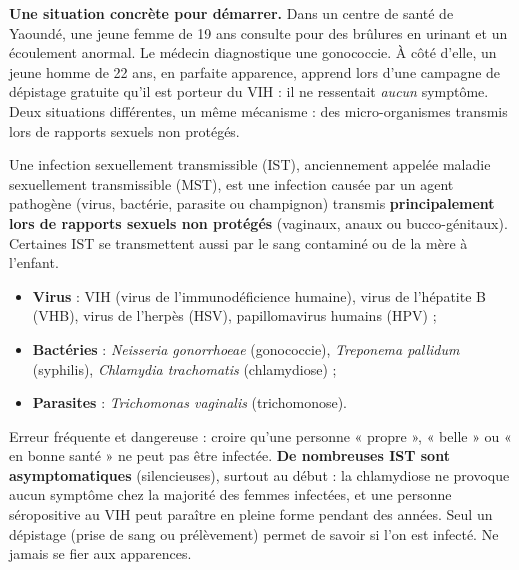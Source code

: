 \documentclass[11pt]{article}
\newcommand{\cle}[1]{{\popxbold\color{popdark}#1}}
\newcounter{popsec}
\newcounter{popsub}
\newcommand{\courssub}[1]{%
  \stepcounter{popsub}%
  \par\vspace{9pt}\noindent{\popxbold\fontsize{11.5}{13}\selectfont\color{popink}{\color{poporange}\thepopsec.\thepopsub}\hspace{6pt}#1}\par\nopagebreak\vspace{4pt}
}
\begin{document}
\courssub{Qu'est-ce qu'une IST ?}

\textbf{Une situation concrète pour démarrer.} Dans un centre de santé de Yaoundé, une jeune femme de 19 ans consulte pour des brûlures en urinant et un écoulement anormal. Le médecin diagnostique une gonococcie. À côté d'elle, un jeune homme de 22 ans, en parfaite apparence, apprend lors d'une campagne de dépistage gratuite qu'il est porteur du VIH : il ne ressentait \emph{aucun} symptôme. Deux situations différentes, un même mécanisme : des micro-organismes transmis lors de rapports sexuels non protégés.

\begin{definition}
Une \cle{infection sexuellement transmissible} (IST), anciennement appelée maladie sexuellement transmissible (MST), est une infection causée par un agent pathogène (virus, bactérie, parasite ou champignon) transmis \textbf{principalement lors de rapports sexuels non protégés} (vaginaux, anaux ou bucco-génitaux). Certaines IST se transmettent aussi par le sang contaminé ou de la mère à l'enfant.
\end{definition}

\begin{exemplebox}
\begin{itemize}
\item \textbf{Virus} : VIH (virus de l'immunodéficience humaine), virus de l'hépatite B (VHB), virus de l'herpès (HSV), papillomavirus humains (HPV) ;
\item \textbf{Bactéries} : \emph{Neisseria gonorrhoeae} (gonococcie), \emph{Treponema pallidum} (syphilis), \emph{Chlamydia trachomatis} (chlamydiose) ;
\item \textbf{Parasites} : \emph{Trichomonas vaginalis} (trichomonose).
\end{itemize}
\end{exemplebox}

\begin{attention}
Erreur fréquente et dangereuse : croire qu'une personne « propre », « belle » ou « en bonne santé » ne peut pas être infectée. \textbf{De nombreuses IST sont asymptomatiques} (silencieuses), surtout au début : la chlamydiose ne provoque aucun symptôme chez la majorité des femmes infectées, et une personne séropositive au VIH peut paraître en pleine forme pendant des années. Seul un \cle{dépistage} (prise de sang ou prélèvement) permet de savoir si l'on est infecté. Ne jamais se fier aux apparences.
\end{attention}
\end{document}
